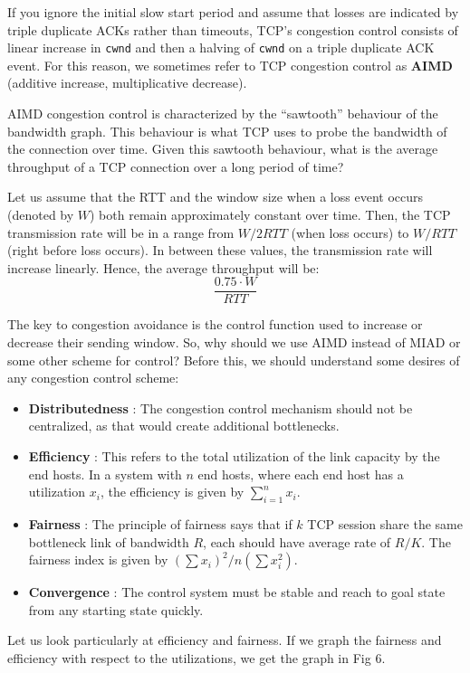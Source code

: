 \documentclass[12pt,letterpaper]{book}
\theoremstyle{definition}
\begin{document}
 If you ignore the initial slow start period and assume that losses are indicated by triple duplicate ACKs rather than timeouts, TCP's congestion control consists of linear increase in \texttt{cwnd} and then a halving of \texttt{cwnd} on a triple duplicate ACK event. For this reason, we sometimes refer to TCP congestion control as \textbf{AIMD} (additive increase, multiplicative decrease). 

 AIMD congestion control is characterized by the ``sawtooth'' behaviour of the bandwidth graph. This behaviour is what TCP uses to probe the bandwidth of the connection over time. Given this sawtooth behaviour, what is the average throughput of a TCP connection over a long period of time?

 Let us assume that the RTT and the window size when a loss event occurs (denoted by $W$) both remain approximately constant over time. Then, the TCP transmission rate will be in a range from $W/2RTT$ (when loss occurs) to $W/RTT$ (right before loss occurs). In between these values, the transmission rate will increase linearly. Hence, the average throughput will be:
 \[\frac{0.75 \cdot W}{RTT}\]

 The key to congestion avoidance is the control function used to increase or decrease their sending window. So, why should we use AIMD instead of MIAD or some other scheme for control? Before this, we should understand some desires of any congestion control scheme:

 \begin{itemize}
   \item \textbf{Distributedness} : The congestion control mechanism should not be centralized, as that would create additional bottlenecks.
   \item \textbf{Efficiency} : This refers to the total utilization of the link capacity by the end hosts. In a system with $n$ end hosts, where each end host has a utilization $x_i$, the efficiency is given by $\sum_{i=1}^n x_i$.
   \item \textbf{Fairness} : The principle of fairness says that if $k$ TCP session share the same bottleneck link of bandwidth $R$, each should have average rate of $R/K$. The fairness index is given by $(\sum x_i)^2 / n (\sum x_i^2)$.
   \item \textbf{Convergence} : The control system must be stable and reach to goal state from any starting state quickly.
 \end{itemize}

 Let us look particularly at efficiency and fairness. If we graph the fairness and efficiency with respect to the utilizations, we get the graph in Fig 6.
\end{document}
